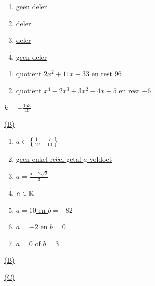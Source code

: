 \documentclass{ximera}
\begin{document}
\begin{oplossing} 
\begin{enumerate}
\item
\hyperlink{oef3.3}{geen deler}
\item
\hyperlink{oef3.3}{deler}
\item
\hyperlink{oef3.3}{deler}
\item
\hyperlink{oef3.3}{geen deler}
\end{enumerate}
\end{oplossing} 

\begin{oplossing} 
\begin{enumerate}
\item
\hyperlink{oef3.4}{quoti\"ent $2x^2+11x+33$ en rest $96$}
\item
\hyperlink{oef3.4}{quoti\"ent $x^4-2x^3+3x^2-4x+5$ en rest $-6$}
\end{enumerate}
\end{oplossing} 

\begin{oplossing} 
\hyperlink{oef3.5}{$k = - \frac{153}{40}$}
\end{oplossing} 

\begin{oplossing} 
\hyperlink{oef3.6}{(B)}
\end{oplossing} 

\begin{oplossing} 
\begin{enumerate}
\item
\hyperlink{oef3.7}{$a \in \left\{\frac{1}{2}, -\frac{7}{10}\right\}$}
\item
\hyperlink{oef3.7}{geen enkel re\"eel getal $a$ voldoet}
\item
\hyperlink{oef3.7}{$a = \frac{5+2\sqrt{2}}{3}$}
\item
\hyperlink{oef3.7}{$a \in \mathbb{R}$}
\item
\hyperlink{oef3.7}{$a = 10$ en $b = -82$}
\item
\hyperlink{oef3.7}{$a = -2$ en $b = 0$}
\item
\hyperlink{oef3.7}{$a = 0$ of $b = 3$}
\end{enumerate}
\end{oplossing} 

\begin{oplossing} 
\hyperlink{oef3.8}{(B)}
\end{oplossing} 

\begin{oplossing} 
\hyperlink{oef3.9}{(C)}
\end{oplossing} 
\end{document}
